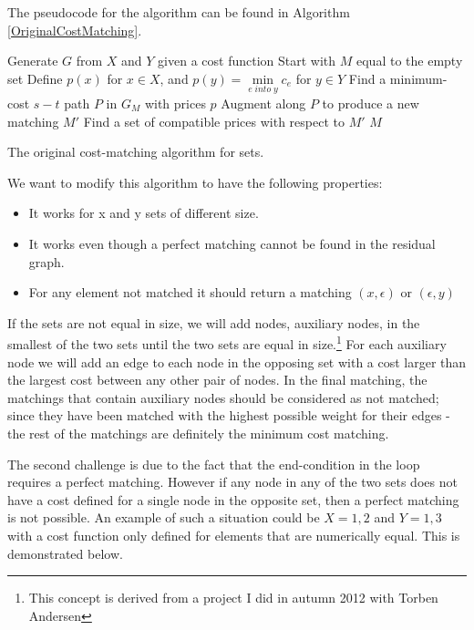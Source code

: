 \documentclass[11pt]{article}
\begin{document}
The pseudocode for the algorithm can be found in Algorithm \ref{OriginalCostMatching}.


\begin{algorithm}
\begin{algorithmic}
	\State Generate $G$ from $X$ and $Y$ given a cost function
	\State Start with $M$ equal to the empty set
	\State Define $p(x)$ for $x \in X$, and  $p(y) = \underset{e \; into \; y}{\operatorname{min}} c_e$ for $y \in Y$
    	\State Find a minimum-cost $s-t$ path $P$ in $G_M$ with prices $p$
    	\State Augment along $P$ to produce a new matching $M'$
    	\State Find a set of compatible prices with respect to $M'$
    \EndWhile
	\State \Return $M$
\EndFunction
\end{algorithmic}
	\caption{The original cost-matching algorithm for sets.}
	\label{OriginalCostMatching}
\end{algorithm}

We want to modify this algorithm to have the following properties:

\begin{itemize}
\item It works for x and y sets of different size. 
\item It works even though a perfect matching cannot be found in the residual graph.
\item For any element not matched it should return a matching $(x, \epsilon)$ or $(\epsilon, y)$
\end{itemize}

If the sets are not equal in size, we will add nodes, auxiliary nodes, in the smallest of the two sets until the two sets are equal in size.\footnote{This concept is derived from a project I did in autumn 2012 with Torben Andersen} For each auxiliary node we will add an edge to each node in the opposing set with a cost larger than the largest cost between any other pair of nodes. In the final matching, the matchings that contain auxiliary nodes should be considered as not matched; since they have been matched with the highest possible weight for their edges - the rest of the matchings are definitely the minimum cost matching.

The second challenge is due to the fact that the end-condition in the loop requires a perfect matching. However if any node in any of the two sets does not have a cost defined for a single node in the opposite set, then a perfect matching is not possible. An example of such a situation could be $X={1, 2}$ and $Y={1, 3}$ with a cost function only defined for elements that are numerically equal. This is demonstrated below. \\
\end{document}
